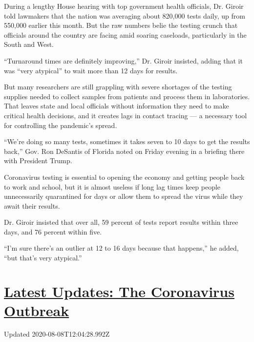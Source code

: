 During a lengthy House hearing with top government health officials, Dr.
Giroir told lawmakers that the nation was averaging about 820,000 tests
daily, up from 550,000 earlier this month. But the raw numbers belie the
testing crunch that officials around the country are facing amid soaring
caseloads, particularly in the South and West.

``Turnaround times are definitely improving,'' Dr. Giroir insisted,
adding that it was ``very atypical'' to wait more than 12 days for
results.

But many researchers are still grappling with severe shortages of the
testing supplies needed to collect samples from patients and process
them in laboratories. That leaves state and local officials without
information they need to make critical health decisions, and it creates
lags in contact tracing --- a necessary tool for controlling the
pandemic's spread.

``We're doing so many tests, sometimes it takes seven to 10 days to get
the results back,'' Gov. Ron DeSantis of Florida noted on Friday evening
in a briefing there with President Trump.

Coronavirus testing is essential to opening the economy and getting
people back to work and school, but it is almost useless if long lag
times keep people unnecessarily quarantined for days or allow them to
spread the virus while they await their results.

Dr. Giroir insisted that over all, 59 percent of tests report results
within three days, and 76 percent within five.

``I'm sure there's an outlier at 12 to 16 days because that happens,''
he added, ``but that's very atypical.''

\hypertarget{latest-updates-the-coronavirus-outbreak}{%
\section{\texorpdfstring{\href{https://www.nytimes.com/2020/08/07/world/covid-19-news.html?action=click\&pgtype=Article\&state=default\&region=MAIN_CONTENT_1\&context=storylines_live_updates}{Latest
Updates: The Coronavirus
Outbreak}}{Latest Updates: The Coronavirus Outbreak}}\label{latest-updates-the-coronavirus-outbreak}}

Updated 2020-08-08T12:04:28.992Z

